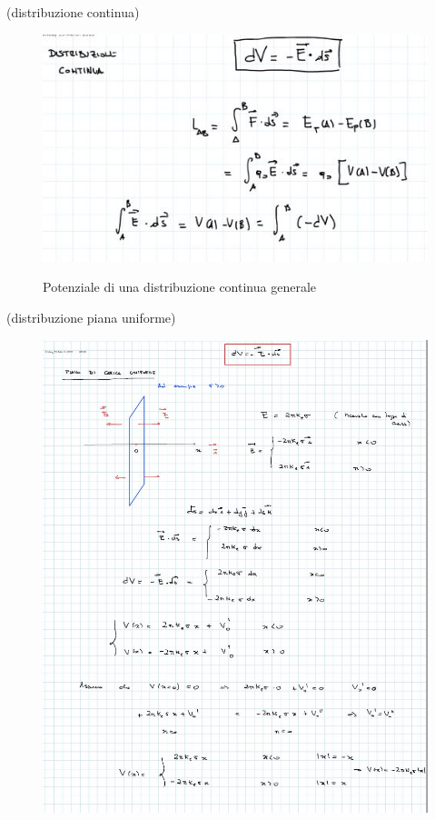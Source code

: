\clearpage
\begin{esempio}(distribuzione continua)
		\begin{figure}[h]
		\begin{center}
			\includegraphics[width=12cm]{lezione8/images/5 Elettrostatica, Il potenziale elettrico}\\
			\caption{Potenziale di una distribuzione continua generale}
		\end{center}
	\end{figure}
\end{esempio}
\clearpage
\begin{esempio}(distribuzione piana uniforme)
	\begin{figure}[h]
	\begin{center}
		\includegraphics[width=13cm]{lezione8/images/6 Elettrostatica, Il potenziale elettrico}\\
		\caption{}
	\end{center}
\end{figure}
\end{esempio}
